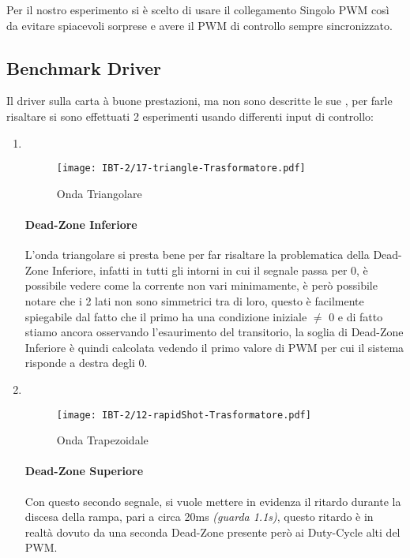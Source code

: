 \noindent
Per il nostro esperimento si è scelto di usare il collegamento Singolo PWM così da evitare spiacevoli sorprese e avere il PWM di controllo sempre sincronizzato.	

\newpage
\subsection{Benchmark Driver}
Il driver sulla carta à buone prestazioni, ma non sono descritte le sue \nonLinearita, per farle risaltare si sono effettuati 2 esperimenti usando differenti input di controllo:
\begin{enumerate}
	\item {} \\ \vspace{-11mm}
	      \begin{figure}[h]
		      \centering
		      \texttt{[image: IBT-2/17-triangle-Trasformatore.pdf]}
		      \caption[Esperimento con Onda Triangolare]{Onda Triangolare}
	      \end{figure}\vspace{-10mm}
	      \paragraph{Dead-Zone Inferiore} L'onda triangolare si presta bene per far risaltare la problematica della Dead-Zone Inferiore, infatti in tutti gli intorni in cui il segnale passa per 0, è possibile vedere come la corrente non vari minimamente, è però possibile notare che i 2 lati non sono simmetrici tra di loro, questo è facilmente spiegabile dal fatto che il primo ha una condizione iniziale $ \neq $ 0 e di fatto stiamo ancora osservando l'esaurimento del transitorio, la soglia di Dead-Zone Inferiore è quindi calcolata vedendo il primo valore di PWM  per cui il sistema risponde a destra degli 0.      
	      
	      \newpage
	\item {} \\
	      \begin{figure}[h]
		      \centering
		      \texttt{[image: IBT-2/12-rapidShot-Trasformatore.pdf]}
		      \caption[Esperimento con Onda Trapezoidale]{Onda Trapezoidale}
	      \end{figure}  \vspace{-10mm}
	      \paragraph{Dead-Zone Superiore} Con questo secondo segnale, si vuole mettere in evidenza il ritardo durante la discesa della rampa, pari a circa 20ms {\small \textit{(guarda 1.1s)}}, questo ritardo è in realtà dovuto da una seconda Dead-Zone presente però ai Duty-Cycle alti del PWM.
	      \vspace{-5mm}

\end{enumerate}
